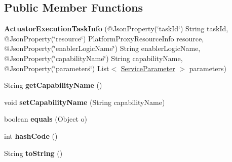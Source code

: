 \subsection*{Public Member Functions}
\begin{DoxyCompactItemize}
\item 
\mbox{\label{classeu_1_1h2020_1_1symbiote_1_1enabler_1_1messaging_1_1model_1_1ActuatorExecutionTaskInfo_a2363c311febafc63f5bdf3e691b70aee}} 
{\bfseries Actuator\+Execution\+Task\+Info} (@Json\+Property(\char`\"{}task\+Id\char`\"{}) String task\+Id, @Json\+Property(\char`\"{}resource\char`\"{}) Platform\+Proxy\+Resource\+Info resource, @Json\+Property(\char`\"{}enabler\+Logic\+Name\char`\"{}) String enabler\+Logic\+Name, @Json\+Property(\char`\"{}capability\+Name\char`\"{}) String capability\+Name, @Json\+Property(\char`\"{}parameters\char`\"{}) List$<$ \hyperlink{classeu_1_1h2020_1_1symbiote_1_1enabler_1_1messaging_1_1model_1_1ServiceParameter}{Service\+Parameter} $>$ parameters)
\item 
\mbox{\label{classeu_1_1h2020_1_1symbiote_1_1enabler_1_1messaging_1_1model_1_1ActuatorExecutionTaskInfo_a9140915a5fbaada8b24d8dca294c52e3}} 
String {\bfseries get\+Capability\+Name} ()
\item 
\mbox{\label{classeu_1_1h2020_1_1symbiote_1_1enabler_1_1messaging_1_1model_1_1ActuatorExecutionTaskInfo_a305ad0bcb25ce3da20ef510cbd91b60d}} 
void {\bfseries set\+Capability\+Name} (String capability\+Name)
\item 
\mbox{\label{classeu_1_1h2020_1_1symbiote_1_1enabler_1_1messaging_1_1model_1_1ActuatorExecutionTaskInfo_a71bfc196713f0b19e187e7b1ac71f819}} 
boolean {\bfseries equals} (Object o)
\item 
\mbox{\label{classeu_1_1h2020_1_1symbiote_1_1enabler_1_1messaging_1_1model_1_1ActuatorExecutionTaskInfo_a3625c32aaa13685c58017d37d81e462b}} 
int {\bfseries hash\+Code} ()
\item 
\mbox{\label{classeu_1_1h2020_1_1symbiote_1_1enabler_1_1messaging_1_1model_1_1ActuatorExecutionTaskInfo_a8430414697eaf19c85330a313d3b7782}} 
String {\bfseries to\+String} ()
\end{DoxyCompactItemize}


